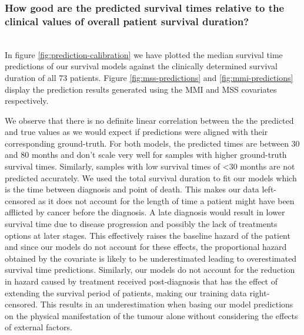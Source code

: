 \documentclass{l4proj}
\begin{document}
\subsubsection{How good are the predicted survival times relative to the clinical values of overall patient survival duration?}\hfill \\
In figure \ref{fig:prediction-calibration} we have plotted the median survival time predictions of our survival models against the clinically determined survival duration of all 73 patients. Figure \ref{fig:mss-predictions} and \ref{fig:mmi-predictions} display the prediction results generated using the MMI and MSS covariates respectively. 

We observe that there is no definite linear correlation between the the predicted and true values as we would expect if predictions were aligned with their corresponding ground-truth. For both models, the predicted times are between 30 and 80 months and don't scale very well for samples with higher ground-truth survival times. Similarly, samples with low survival times of <30 months are not predicted accurately. We used the total survival duration to fit our models which is the time between diagnosis and point of death. This makes our data left-censored as it does not account for the length of time a patient might have been afflicted by cancer before the diagnosis. A late diagnosis would result in lower survival time due to disease progression and possibly the lack of treatments options at later stages. This effectively raises the baseline hazard of the patient and since our models do not account for these effects, the proportional hazard obtained by the covariate is likely to be underestimated leading to overestimated survival time predictions. Similarly, our models do not account for the reduction in hazard caused by treatment received post-diagnosis that has the effect of extending the survival period of patients, making our training data right-censored. This results in an underestimation when basing our model predictions on the physical manifestation of the tumour alone without considering the effects of external factors. 
\end{document}
